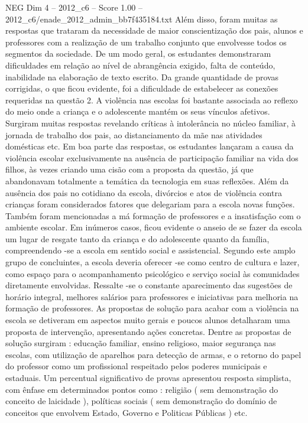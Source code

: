 \begin{textsample}{NEG Dim 4 – 2012\_c6 – Score 1.00 – 2012\_c6/enade\_2012\_admin\_bb7f435184.txt}
Além disso, foram muitas as respostas que trataram da necessidade de maior conscientização dos pais, alunos e professores com a realização de um trabalho conjunto que envolvesse todos os segmentos da sociedade.
De um modo geral, os estudantes demonstraram dificuldades em relação ao nível de abrangência exigido, falta de conteúdo, inabilidade na elaboração de texto escrito.
Da grande quantidade de provas corrigidas, o que ficou evidente, foi a dificuldade de estabelecer as conexões requeridas na questão 2.
A violência nas escolas foi bastante associada ao reflexo do meio onde a criança e o adolescente mantém os seus vínculos afetivos.
Surgiram muitas respostas revelando críticas à intolerância no núcleo familiar, à jornada de trabalho dos pais, ao distanciamento da mãe nas atividades domésticas etc.
Em boa parte das respostas, os estudantes lançaram a causa da violência escolar exclusivamente na ausência de participação familiar na vida dos filhos, às vezes criando uma cisão com a proposta da questão, já que abandonavam totalmente a temática da tecnologia em suas reflexões.
Além da ausência dos pais no cotidiano da escola, divórcios e atos de violência contra crianças foram considerados fatores que delegariam para a escola novas funções.
Também foram mencionadas a má formação de professores e a insatisfação com o ambiente escolar.
Em inúmeros casos, ficou evidente o anseio de se fazer da escola um lugar de resgate tanto da criança e do adolescente quanto da família, compreendendo -se a escola em sentido social e assistencial.
Segundo este amplo grupo de concluintes, a escola deveria oferecer -se como centro de cultura e lazer, como espaço para o acompanhamento psicológico e serviço social às comunidades diretamente envolvidas.
Ressalte -se o constante aparecimento das sugestões de horário integral, melhores salários para professores e iniciativas para melhoria na formação de professores.
As propostas de solução para acabar com a violência na escola se detiveram em aspectos muito gerais e poucos alunos detalharam uma proposta de intervenção, apresentando ações concretas.
Dentre as propostas de solução surgiram : educação familiar, ensino religioso, maior segurança nas escolas, com utilização de aparelhos para detecção de armas, e o retorno do papel do professor como um profissional respeitado pelos poderes municipais e estaduais.
Um percentual significativo de provas apresentou resposta simplista, com ênfase em determinados pontos como : religião ( sem demonstração do conceito de laicidade ), políticas sociais ( sem demonstração do domínio de conceitos que envolvem Estado, Governo e Politicas Públicas ) etc.

\end{textsample}
